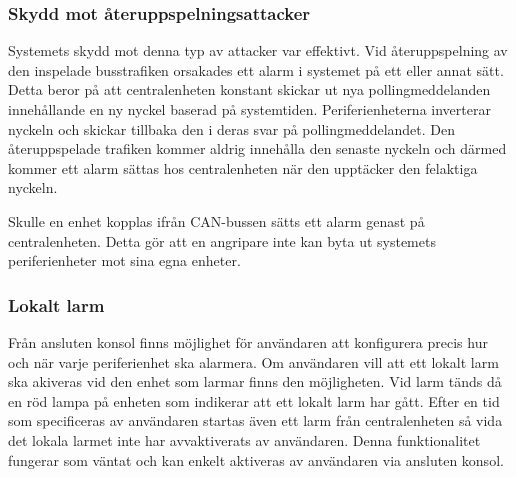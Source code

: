 \documentclass[a4paper]{article}
\newcommand{\todo}[1]{\marginpar{TODO: #1}\vspace{1cm}}
\begin{document}
\subsubsection{Skydd mot återuppspelningsattacker}
Systemets skydd mot denna typ av attacker var effektivt.
Vid återuppspelning av den inspelade busstrafiken orsakades ett alarm i systemet på ett eller annat sätt.
Detta beror på att centralenheten konstant skickar ut nya pollingmeddelanden innehållande en ny nyckel baserad på systemtiden.
Periferienheterna inverterar nyckeln och skickar tillbaka den i deras svar på pollingmeddelandet.
Den återuppspelade trafiken kommer aldrig innehålla den senaste nyckeln och därmed kommer ett alarm sättas hos centralenheten när den upptäcker den felaktiga nyckeln.

Skulle en enhet kopplas ifrån CAN-bussen sätts ett alarm genast på centralenheten.
Detta gör att en angripare inte kan byta ut systemets periferienheter mot sina egna enheter.

\subsubsection{Lokalt larm}
Från ansluten konsol finns möjlighet för användaren att konfigurera precis hur och när varje periferienhet ska alarmera.
Om användaren vill att ett lokalt larm ska akiveras vid den enhet som larmar finns den möjligheten.
Vid larm tänds då en röd lampa på enheten som indikerar att ett lokalt larm har gått.
Efter en tid som specificeras av användaren startas även ett larm från centralenheten så vida det lokala larmet inte har avvaktiverats av användaren.
Denna funktionalitet fungerar som väntat och kan enkelt aktiveras av användaren via ansluten konsol.
\end{document}
